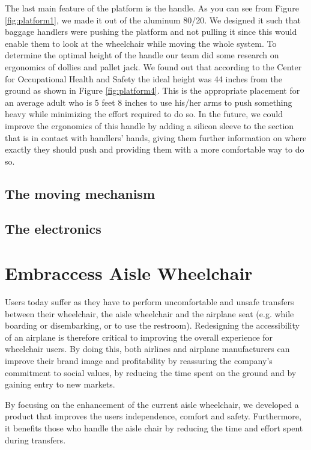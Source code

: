 The last main feature of the platform is the handle. As you can see from Figure \ref{fig:platform1}, we made it out of the aluminum 80/20. We designed it such that baggage handlers were pushing the platform and not pulling it since this would enable them to look at the wheelchair while moving the whole system. To determine the optimal height of the handle our team did some research on ergonomics of dollies and pallet jack. We found out that according to the Center for Occupational Health and Safety the ideal height was 44 inches from the ground as shown in Figure \ref{fig:platform4}. This is the appropriate placement for an average adult who is 5 feet 8 inches  to use his/her arms to push something heavy while minimizing the effort required to do so. In the future, we could improve the ergonomics of this handle by adding a silicon sleeve to the section that is in contact with handlers’ hands, giving them further information on where exactly they should push and providing them with a more comfortable way to do so.

\subsection{The moving mechanism}

\subsection{The electronics}





\section{Embraccess Aisle Wheelchair}

Users today suffer as they have to perform uncomfortable and unsafe transfers between their wheelchair, the aisle wheelchair and the airplane seat (e.g. while boarding or disembarking, or to use the restroom). Redesigning the accessibility of an airplane is therefore critical to improving the overall experience for wheelchair users. By doing this, both airlines and airplane manufacturers can improve their brand image and profitability by reassuring the company's commitment to social values, by reducing the time spent on the ground and by gaining entry to new markets.

By focusing on the enhancement of the current aisle wheelchair, we developed a product that improves the users independence, comfort and safety. Furthermore, it benefits those who handle the aisle chair by reducing the time and effort spent during transfers.

